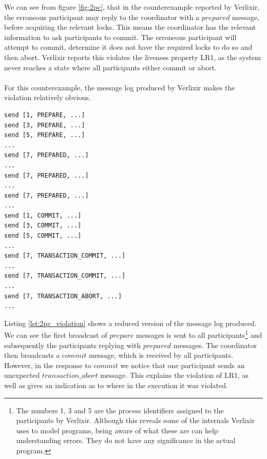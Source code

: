 We can see from figure \ref{fig:2pc}, that in the counterexample reported by Verlixir, the erroneous participant may reply to the coordinator with a $prepared$ message, before acquiring the relevant locks. This means the coordinator has the relevant information to ask participants to commit. The erroneous participant will attempt to commit, determine it does not have the required locks to do so and then abort. Verlixir reports this violates the liveness property LR1, as the system never reaches a state where all participants either commit or abort.
\\ \\
For this counterexample, the message log produced by Verlixir makes the violation relatively obvious.
\begin{lstlisting}[xleftmargin=.01\linewidth, xrightmargin=0.01\linewidth, caption={Message log produced by counterexample violating LR1.}, label={lst:2pc_violation}]
send [1, PREPARE, ...]
send [3, PREPARE, ...]
send [5, PREPARE, ...]
...
send [7, PREPARED, ...]
...
send [7, PREPARED, ...]
...
send [7, PREPARED, ...]
...
send [1, COMMIT, ...]
send [3, COMMIT, ...]
send [5, COMMIT, ...]
...
send [7, TRANSACTION_COMMIT, ...]
...
send [7, TRANSACTION_COMMIT, ...]
...
send [7, TRANSACTION_ABORT, ...]
...
\end{lstlisting}
Listing \ref{lst:2pc_violation} shows a reduced version of the message log produced. We can see the first broadcast of $prepare$ messages is sent to all participants\footnote{The numbers 1, 3 and 5 are the process identifiers assigned to the participants by Verlixir. Although this reveals some of the internals Verlixir uses to model programs, being aware of what these are can help understanding errors. They do not have any significance in the actual program.} and subsequently the participants replying with $prepared$ messages. The coordinator then broadcasts a $commit$ message, which is received by all participants. However, in the response to $commit$ we notice that one participant sends an unexpected $transaction\_abort$ message. This explains the violation of LR1, as well as gives an indication as to where in the execution it was violated.
